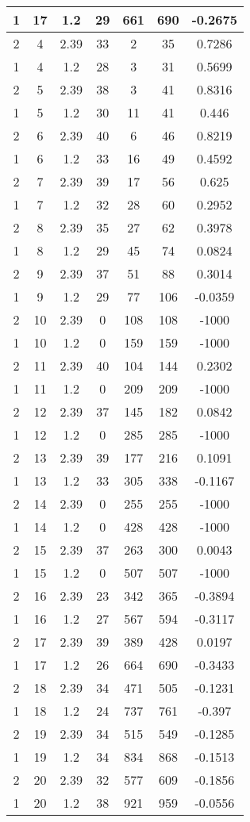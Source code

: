 \documentclass[letterpaper, 12pt]{article}
\begin{document}
\begin{longtable}{|c|c|c|c|c|c|c|}
\hline
1 & 17 & 1.2 & 29 & 661 & 690 & -0.2675 \\
\hline
2 & 4 & 2.39 & 33 & 2 & 35 & 0.7286 \\
\hline
1 & 4 & 1.2 & 28 & 3 & 31 & 0.5699 \\
\hline
2 & 5 & 2.39 & 38 & 3 & 41 & 0.8316 \\
\hline
1 & 5 & 1.2 & 30 & 11 & 41 & 0.446 \\
\hline
2 & 6 & 2.39 & 40 & 6 & 46 & 0.8219 \\
\hline
1 & 6 & 1.2 & 33 & 16 & 49 & 0.4592 \\
\hline
2 & 7 & 2.39 & 39 & 17 & 56 & 0.625 \\
\hline
1 & 7 & 1.2 & 32 & 28 & 60 & 0.2952 \\
\hline
2 & 8 & 2.39 & 35 & 27 & 62 & 0.3978 \\
\hline
1 & 8 & 1.2 & 29 & 45 & 74 & 0.0824 \\
\hline
2 & 9 & 2.39 & 37 & 51 & 88 & 0.3014 \\
\hline
1 & 9 & 1.2 & 29 & 77 & 106 & -0.0359 \\
\hline
2 & 10 & 2.39 & 0 & 108 & 108 & -1000 \\
\hline
1 & 10 & 1.2 & 0 & 159 & 159 & -1000 \\
\hline
2 & 11 & 2.39 & 40 & 104 & 144 & 0.2302 \\
\hline
1 & 11 & 1.2 & 0 & 209 & 209 & -1000 \\
\hline
2 & 12 & 2.39 & 37 & 145 & 182 & 0.0842 \\
\hline
1 & 12 & 1.2 & 0 & 285 & 285 & -1000 \\
\hline
2 & 13 & 2.39 & 39 & 177 & 216 & 0.1091 \\
\hline
1 & 13 & 1.2 & 33 & 305 & 338 & -0.1167 \\
\hline
2 & 14 & 2.39 & 0 & 255 & 255 & -1000 \\
\hline
1 & 14 & 1.2 & 0 & 428 & 428 & -1000 \\
\hline
2 & 15 & 2.39 & 37 & 263 & 300 & 0.0043 \\
\hline
1 & 15 & 1.2 & 0 & 507 & 507 & -1000 \\
\hline
2 & 16 & 2.39 & 23 & 342 & 365 & -0.3894 \\
\hline
1 & 16 & 1.2 & 27 & 567 & 594 & -0.3117 \\
\hline
2 & 17 & 2.39 & 39 & 389 & 428 & 0.0197 \\
\hline
1 & 17 & 1.2 & 26 & 664 & 690 & -0.3433 \\
\hline
2 & 18 & 2.39 & 34 & 471 & 505 & -0.1231 \\
\hline
1 & 18 & 1.2 & 24 & 737 & 761 & -0.397 \\
\hline
2 & 19 & 2.39 & 34 & 515 & 549 & -0.1285 \\
\hline
1 & 19 & 1.2 & 34 & 834 & 868 & -0.1513 \\
\hline
2 & 20 & 2.39 & 32 & 577 & 609 & -0.1856 \\
\hline
1 & 20 & 1.2 & 38 & 921 & 959 & -0.0556 \\
\hline
\end{longtable}
\end{document}

